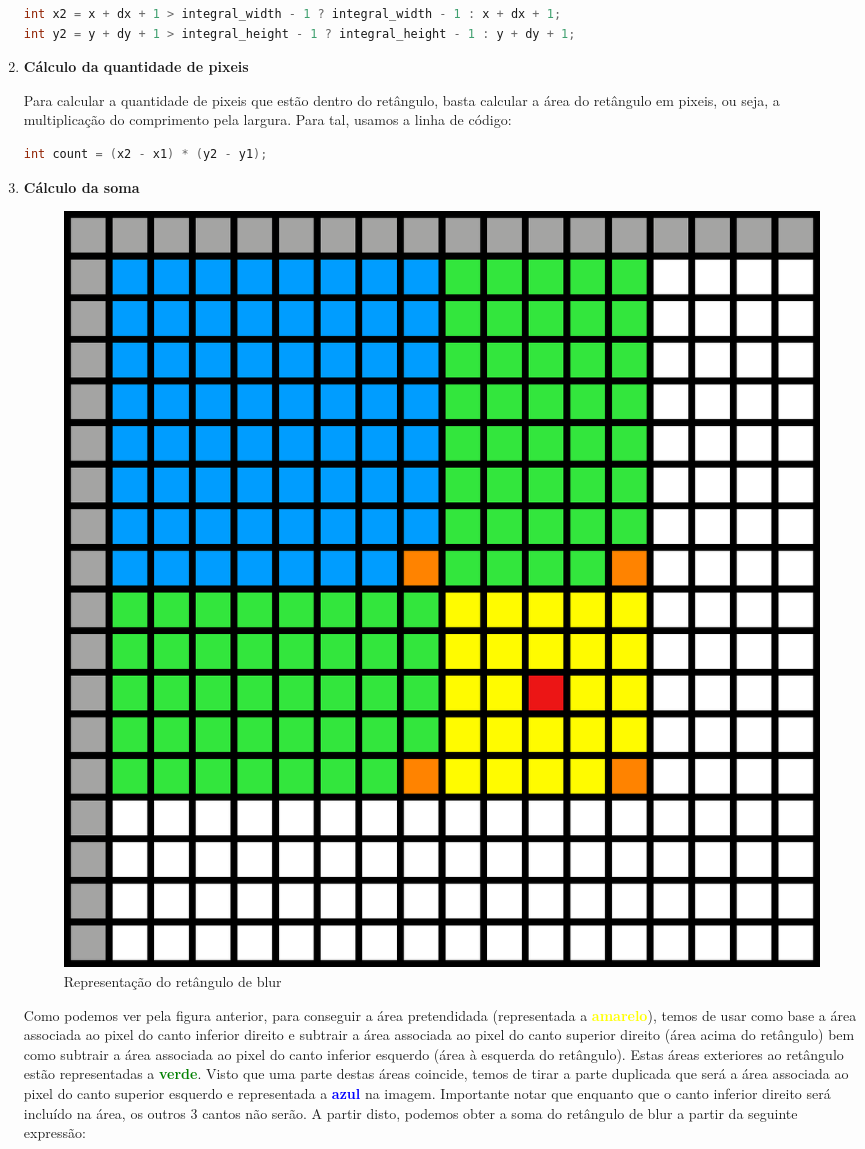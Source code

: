 \begin{enumerate}
{\begin{enumerate}
{        \begin{lstlisting}[language=C]
int x2 = x + dx + 1 > integral_width - 1 ? integral_width - 1 : x + dx + 1;
int y2 = y + dy + 1 > integral_height - 1 ? integral_height - 1 : y + dy + 1;
        \end{lstlisting}
    }
\end{enumerate}
}

\item {
\textbf{Cálculo da quantidade de pixeis}

Para calcular a quantidade de pixeis que estão dentro do retângulo, basta calcular a área do retângulo em pixeis, ou seja, a multiplicação do comprimento pela largura. Para tal, usamos a linha de código:

\begin{lstlisting}[language=C]
    int count = (x2 - x1) * (y2 - y1);
\end{lstlisting}
}

\pagebreak

\item {
\textbf{Cálculo da soma}

\begin{figure}[H]
    \centering
    \includegraphics[width=0.4\linewidth]{images/rectangle-area.png}
    \caption{Representação do retângulo de blur}
\end{figure}

Como podemos ver pela figura anterior, para conseguir a área pretendidada (representada a \textcolor{yellow}{\textbf{amarelo}}), temos de usar como base a área associada ao pixel do canto inferior direito e subtrair a área associada ao pixel do canto superior direito (área acima do retângulo) bem como subtrair a área associada ao pixel do canto inferior esquerdo (área à esquerda do retângulo). Estas áreas exteriores ao retângulo estão representadas a \textcolor{green}{\textbf{verde}}. Visto que uma parte destas áreas coincide, temos de tirar a parte duplicada que será a área associada ao pixel do canto superior esquerdo e representada a \textcolor{blue}{\textbf{azul}} na imagem. Importante notar que enquanto que o canto inferior direito será incluído na área, os outros 3 cantos não serão. A partir disto, podemos obter a soma do retângulo de blur a partir da seguinte expressão:

}
\end{enumerate}
